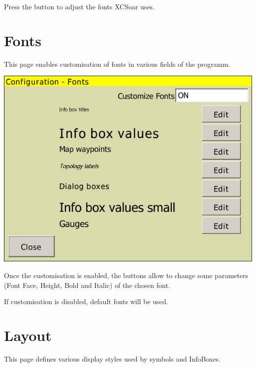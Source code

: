 \documentclass[a4paper,12pt]{refrep}
\begin{document}
Press the  button to adjust the fonts XCSoar uses.


\clearpage
\section{Fonts}

This page enables customisation of fonts in various fields of the programm.

\begin{center}
\includegraphics[angle=0,width=\linewidth,keepaspectratio='true']{figures/config-fonts.png}
\end{center}

Once the customisation is enabled, the  buttons allow to change some parameters (Font 
Face, Height, Bold and Italic) of the chosen font.

If customisation is disabled, default fonts will be used.

\clearpage
\section{Layout}

This page defines various display styles used by symbols and InfoBoxes.
\end{document}
